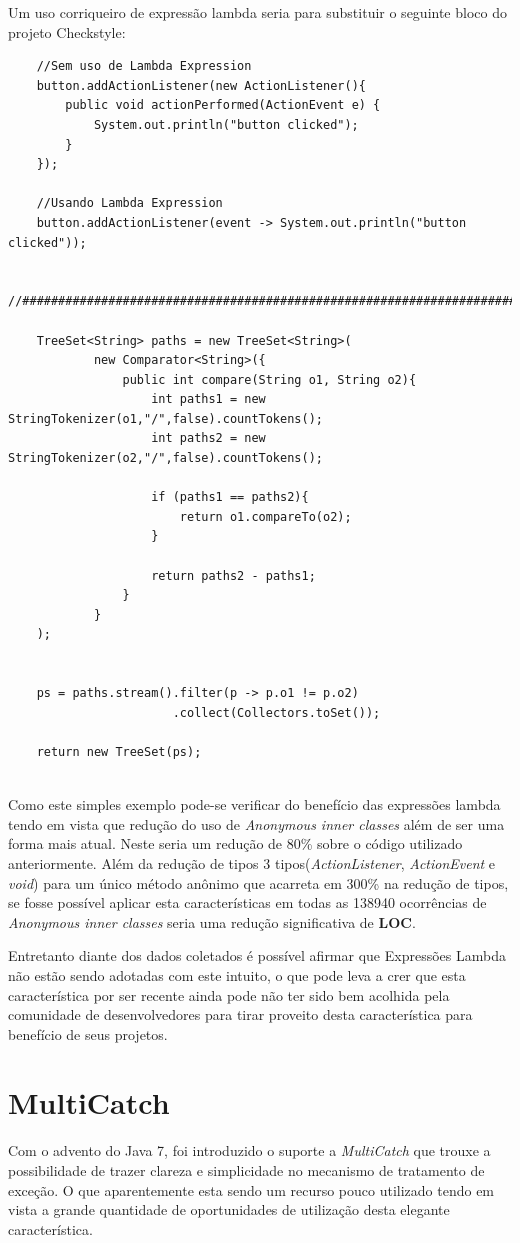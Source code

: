 Um uso corriqueiro de expressão lambda seria para substituir o seguinte bloco do projeto Checkstyle:
\begin{lstlisting}
	//Sem uso de Lambda Expression
	button.addActionListener(new ActionListener(){
		public void actionPerformed(ActionEvent e) {
			System.out.println("button clicked");
		}
	});

	//Usando Lambda Expression
	button.addActionListener(event -> System.out.println("button clicked"));
	
	//###########################################################################
	
	TreeSet<String> paths = new TreeSet<String>(
			new Comparator<String>({
				public int compare(String o1, String o2){
					int paths1 = new StringTokenizer(o1,"/",false).countTokens();
					int paths2 = new StringTokenizer(o2,"/",false).countTokens();
				
					if (paths1 == paths2){
						return o1.compareTo(o2);
					}
				
					return paths2 - paths1;
				}
			}
	);
	
	
	ps = paths.stream().filter(p -> p.o1 != p.o2)
					   .collect(Collectors.toSet());
	
	return new TreeSet(ps);
	
\end{lstlisting}

Como este simples exemplo pode-se verificar do benefício das expressões lambda tendo em vista que  redução do uso de \textit{Anonymous inner classes} além de ser uma forma mais atual. Neste seria um redução de 80\% sobre o código utilizado anteriormente. Além da redução de tipos 3 tipos(\textit{ActionListener}, \textit{ActionEvent} e \textit{void}) para um único método anônimo que acarreta em 300\% na redução de tipos,  se fosse possível aplicar esta características em todas as 138940 ocorrências de \textit{Anonymous inner classes} seria uma redução significativa de \textbf{LOC}.

Entretanto diante dos dados coletados é possível afirmar que Expressões Lambda não estão sendo adotadas com este intuito, o que pode leva a crer que esta característica por ser recente ainda pode não ter sido bem acolhida pela comunidade de desenvolvedores para tirar proveito desta  característica para benefício de seus projetos.\\

\section{MultiCatch}
Com o advento do Java 7, foi introduzido o suporte a \textit{MultiCatch} que trouxe a possibilidade de trazer clareza e simplicidade no mecanismo de tratamento de exceção. O que aparentemente esta sendo um recurso pouco utilizado tendo em vista a grande quantidade de oportunidades de utilização desta elegante característica.\\

